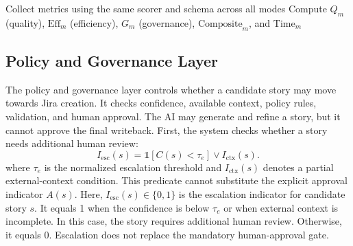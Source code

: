 \documentclass[pdflatex,sn-basic]{sn-jnl}
\begin{document}
\begin{algorithm}[H]
\DontPrintSemicolon
\footnotesize
\caption{Ablation-Mode Execution for B0/B1/B2/B3 Comparison}
\label{alg:ablation-exec}
Collect metrics using the same scorer and schema across all modes\;
Compute $Q_m$ (quality), $\mathrm{Eff}_m$ (efficiency), $G_m$ (governance), $\mathrm{Composite}_m$, and $\mathrm{Time}_m$\;
\;
\end{algorithm}

\subsection{Policy and Governance Layer}

The policy and governance layer controls whether a candidate story may move towards Jira creation. It checks confidence, available context, policy rules, validation, and human approval. The AI may generate and refine a story, but it cannot approve the final writeback.
First, the system checks whether a story needs additional human review:
\begin{equation}
I_{\mathrm{esc}}(s)
= \mathbb{1}[C(s) < \tau_e] \lor I_{\mathrm{ctx}}(s).
\end{equation}
where $\tau_e$ is the normalized escalation threshold and $I_{\text{ctx}}(s)$ denotes a partial external-context condition. This predicate cannot substitute the explicit approval indicator $A(s)$. Here, $I_{\mathrm{esc}}(s)\in\{0,1\}$ is the escalation indicator for candidate story $s$. It equals 1 when the confidence is below $\tau_e$ or when external context is incomplete. In this case, the story requires additional human review. Otherwise, it equals 0. Escalation does not replace the mandatory human-approval gate.
\end{document}

